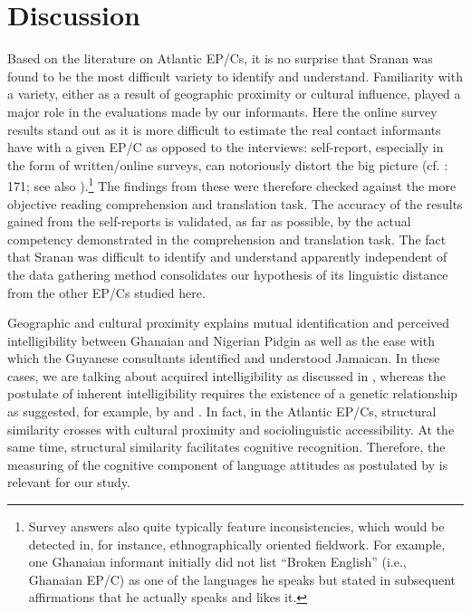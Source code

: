 \documentclass[output=paper,colorlinks,citecolor=brown]{langscibook}
\begin{document}
\section{Discussion}\label{sec:04:4}

Based on the literature on Atlantic EP/Cs, it is no surprise that Sranan was found to be the most difficult variety to identify and understand. Familiarity with a variety, either as a result of geographic proximity or cultural influence, played a major role in the evaluations made by our informants. Here the online survey results stand out as it is more difficult to estimate the real contact informants have with a given EP/C as opposed to the interviews: self-report, especially in the form of written/online surveys, can notoriously distort the big picture (cf. \cite{Codo_2008}: 171; see also ).\footnote{Survey answers also quite typically feature inconsistencies, which would be detected in, for instance, ethnographically oriented fieldwork. For example, one Ghanaian informant initially did not list “Broken English” (i.e., Ghanaian EP/C) as one of the languages he speaks but stated in subsequent affirmations that he actually speaks and likes it.} The findings from these were therefore checked against the more objective reading comprehension and translation task. The accuracy of the results gained from the self-reports is validated, as far as possible, by the actual competency demonstrated in the comprehension and translation task. The fact that Sranan was difficult to identify and understand apparently independent of the data gathering method consolidates our hypothesis of its linguistic distance from the other EP/Cs studied here.

Geographic and cultural proximity explains mutual identification and perceived intelligibility between Ghanaian and Nigerian Pidgin as well as the ease with which the Guyanese consultants identified and understood Jamaican. In these cases, we are talking about acquired intelligibility as discussed in , whereas the postulate of inherent intelligibility requires the existence of a genetic relationship as suggested, for example, by \citet{Hancock_1986} and \citet{McWhorter_1996}. In fact, in the Atlantic EP/Cs, structural similarity crosses with cultural proximity and sociolinguistic accessibility. At the same time, structural similarity facilitates cognitive recognition. Therefore, the measuring of the cognitive component of language attitudes as postulated by \citet[139]{Agheyisi_Fishman_1970} is relevant for our study.
\end{document}
